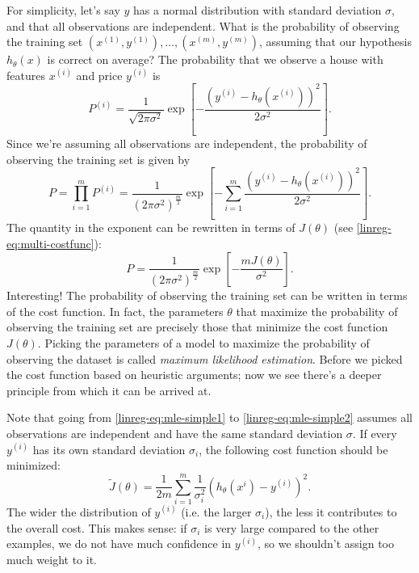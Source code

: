 \documentclass{article}
\theoremstyle{definition}
\begin{document}
For simplicity, let's say $y$ has a normal distribution with standard deviation $\sigma$, and that all observations are independent. What is the probability of observing the training set $(x^{(1)}, y^{(1)}), \dots, (x^{(m)}, y^{(m)})$, assuming that our hypothesis $h_{\theta}(x)$ is correct on average? The probability that we observe a house with features $x^{(i)}$ and price $y^{(i)}$ is
\begin{equation}
    P^{(i)} = \frac{1}{\sqrt{2\pi\sigma^2}}\exp\left[-\frac{(y^{(i)} - h_{\theta}(x^{(i)}))^2}{2\sigma^2}\right].
\end{equation}
Since we're assuming all observations are independent, the probability of observing the training set is given by
\begin{equation}
    P = \prod_{i=1}^mP^{(i)} = \frac{1}{(2\pi\sigma^2)^{\frac{m}{2}}}\exp\left[-\sum_{i=1}^{m}\frac{(y^{(i)} - h_{\theta}(x^{(i)}))^2}{2\sigma^2}\right].
    \label{linreg-eq:mle-simple1}
\end{equation}
The quantity in the exponent can be rewritten in terms of $J(\theta)$
(see \eqref{linreg-eq:multi-costfunc}):
\begin{equation}
    P = \frac{1}{(2\pi\sigma^2)^{\frac{m}{2}}}\exp\left[-\frac{mJ(\theta)}{\sigma^2}\right].
    \label{linreg-eq:mle-simple2}
\end{equation}
Interesting! The probability of observing the training set can be written in terms of the cost function. In fact, the parameters $\theta$ that maximize the probability of observing the training set are precisely those that minimize the cost function $J(\theta)$. Picking the parameters of a model to maximize the probability of observing the dataset is called \textit{maximum likelihood estimation}. Before we picked the cost function based on heuristic arguments; now we see there's a deeper principle from which it can be arrived at.

Note that going from \eqref{linreg-eq:mle-simple1} to \eqref{linreg-eq:mle-simple2} assumes all observations are independent and have the same standard deviation $\sigma$. If every $y^{(i)}$ has its own standard deviation $\sigma_i$, the following cost function should be minimized:
\begin{equation}
    \tilde{J}(\theta) = \frac{1}{2m}\sum_{i=1}^{m}\frac{1}{\sigma_i^2}(h_{\theta}(x^{i}) - y^{(i)})^2.
\end{equation}
The wider the distribution of $y^{(i)}$ (i.e. the larger $\sigma_i$), the less it contributes to the overall cost. This makes sense: if $\sigma_i$ is very large compared to the other examples, we do not have much confidence in $y^{(i)}$, so we shouldn't assign too much weight to it.
\end{document}
